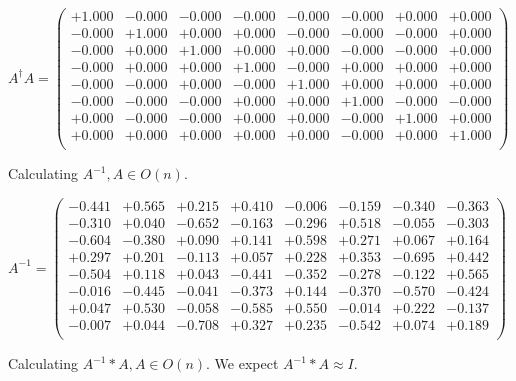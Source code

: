 \documentclass[9pt]{article}
\theoremstyle{plain}
\theoremstyle{definition}
\theoremstyle{remark}
\numberwithin{equation}{section}
\begin{document}
$A^{\dag} A = \left(
\begin{array}{
cccccccc}
+1.000 & -0.000 & -0.000 & -0.000 & -0.000 & -0.000 & +0.000 & +0.000 \\
-0.000 & +1.000 & +0.000 & +0.000 & -0.000 & -0.000 & -0.000 & +0.000 \\
-0.000 & +0.000 & +1.000 & +0.000 & +0.000 & -0.000 & -0.000 & +0.000 \\
-0.000 & +0.000 & +0.000 & +1.000 & -0.000 & +0.000 & +0.000 & +0.000 \\
-0.000 & -0.000 & +0.000 & -0.000 & +1.000 & +0.000 & +0.000 & +0.000 \\
-0.000 & -0.000 & -0.000 & +0.000 & +0.000 & +1.000 & -0.000 & -0.000 \\
+0.000 & -0.000 & -0.000 & +0.000 & +0.000 & -0.000 & +1.000 & +0.000 \\
+0.000 & +0.000 & +0.000 & +0.000 & +0.000 & -0.000 & +0.000 & +1.000 \\
\end{array}
\right)$ \newline 

Calculating $A^{-1} ,  A \in O(n)$.

$A^{-1} = \left(
\begin{array}{
cccccccc}
-0.441 & +0.565 & +0.215 & +0.410 & -0.006 & -0.159 & -0.340 & -0.363 \\
-0.310 & +0.040 & -0.652 & -0.163 & -0.296 & +0.518 & -0.055 & -0.303 \\
-0.604 & -0.380 & +0.090 & +0.141 & +0.598 & +0.271 & +0.067 & +0.164 \\
+0.297 & +0.201 & -0.113 & +0.057 & +0.228 & +0.353 & -0.695 & +0.442 \\
-0.504 & +0.118 & +0.043 & -0.441 & -0.352 & -0.278 & -0.122 & +0.565 \\
-0.016 & -0.445 & -0.041 & -0.373 & +0.144 & -0.370 & -0.570 & -0.424 \\
+0.047 & +0.530 & -0.058 & -0.585 & +0.550 & -0.014 & +0.222 & -0.137 \\
-0.007 & +0.044 & -0.708 & +0.327 & +0.235 & -0.542 & +0.074 & +0.189 \\
\end{array}
\right)$ \newline 

Calculating $A^{-1} *A  ,  A \in O(n)$.   We expect $A^{-1} *A  \approx I$. 
\end{document}
